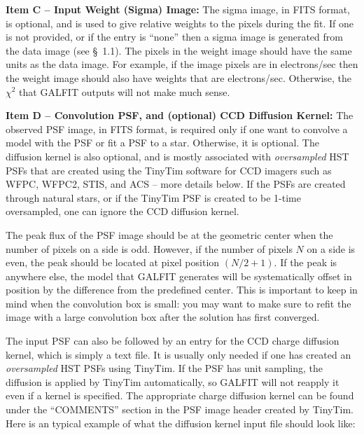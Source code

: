 \documentclass[preprint]{aastex}
\begin{document}
\smallskip

{\bf Item C -- Input Weight (Sigma) Image:} The sigma image, in FITS format,
	 is optional, and is used to give relative weights to the pixels
	 during the fit.  If one is not provided, or if the entry is ``none''
	 then a sigma image is generated from the data image (see \S~1.1).
	 The pixels in the weight image should have the same units as the data
	 image.  For example, if the image pixels are in electrons/sec then
	 the weight image should also have weights that are electrons/sec.
	 Otherwise, the $\chi^2$ that GALFIT outputs will not make much
	 sense.

\smallskip

{\bf Item D -- Convolution PSF, and (optional) CCD Diffusion Kernel:} The
	 observed PSF image, in FITS format, is required only if one want to
	 convolve a model with the PSF or fit a PSF to a star.  Otherwise, it
	 is optional.  The diffusion kernel is also optional, and is mostly
	 associated with {\it oversampled} HST PSFs that are created using the
	 TinyTim software for CCD imagers such as WFPC, WFPC2, STIS, and ACS
	 -- more details below.  If the PSFs are created through natural
	 stars, or if the TinyTim PSF is created to be 1-time oversampled, one
	 can ignore the CCD diffusion kernel.

	 The peak flux of the PSF image should be at the geometric center when
	 the number of pixels on a side is odd.  However, if the number of
	 pixels $N$ on a side is even, the peak should be located at pixel
	 position $(N/2 + 1)$.  If the peak is anywhere else, the model that
	 GALFIT generates will be systematically offset in position by the
	 difference from the predefined center.  This is important to keep in
	 mind when the convolution box is small:  you may want to make sure to
	 refit the image with a large convolution box after the solution has
	 first converged.

	 The input PSF can also be followed by an entry for the CCD charge
	 diffusion kernel, which is simply a text file.  It is usually only
	 needed if one has created an {\it oversampled} HST PSFs using
	 TinyTim.  If the PSF has unit sampling, the diffusion is applied by
	 TinyTim automatically, so GALFIT will not reapply it even if a kernel
	 is specified.  The appropriate charge diffusion kernel can be found
	 under the ``COMMENTS'' section in the PSF image header created by
	 TinyTim.  Here is an typical example of what the diffusion kernel
	 input file should look like:
\end{document}
